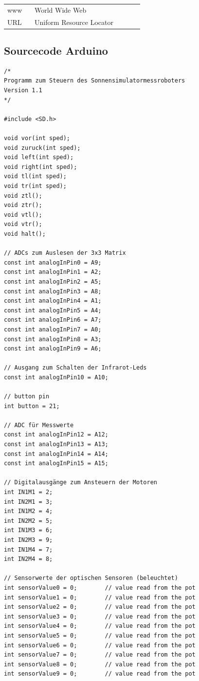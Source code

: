 \documentclass[a4paper,bibtotoc,oneside]{scrbook}
\begin{document}
\hspace{-17mm}\begin{tabular}{>{\raggedleft}p{0.2\linewidth} p{0.75\linewidth} p{0.1\linewidth}}
www & World Wide Web \\
URL & Uniform Resource Locator
\end{tabular}


\begin{appendix}
\chapter{Sourcecode Arduino}

\begin{verbatim}
/*
Programm zum Steuern des Sonnensimulatormessroboters
Version 1.1 
*/

#include <SD.h>

void vor(int sped);
void zuruck(int sped);
void left(int sped);
void right(int sped);
void tl(int sped);
void tr(int sped);
void ztl();
void ztr();
void vtl();
void vtr();
void halt(); 

// ADCs zum Auslesen der 3x3 Matrix
const int analogInPin0 = A9;  
const int analogInPin1 = A2;
const int analogInPin2 = A5;
const int analogInPin3 = A8;
const int analogInPin4 = A1;
const int analogInPin5 = A4;
const int analogInPin6 = A7;
const int analogInPin7 = A0;
const int analogInPin8 = A3;
const int analogInPin9 = A6;

// Ausgang zum Schalten der Infrarot-Leds
const int analogInPin10 = A10;

// button pin
int button = 21; 

// ADC für Messwerte
const int analogInPin12 = A12;
const int analogInPin13 = A13;
const int analogInPin14 = A14;
const int analogInPin15 = A15;

// Digitalausgänge zum Ansteuern der Motoren
int IN1M1 = 2;
int IN2M1 = 3;
int IN1M2 = 4;
int IN2M2 = 5;
int IN1M3 = 6;
int IN2M3 = 9;
int IN1M4 = 7;
int IN2M4 = 8;

// Sensorwerte der optischen Sensoren (beleuchtet)
int sensorValue0 = 0;        // value read from the pot
int sensorValue1 = 0;        // value read from the pot
int sensorValue2 = 0;        // value read from the pot
int sensorValue3 = 0;        // value read from the pot
int sensorValue4 = 0;        // value read from the pot
int sensorValue5 = 0;        // value read from the pot
int sensorValue6 = 0;        // value read from the pot
int sensorValue7 = 0;        // value read from the pot
int sensorValue8 = 0;        // value read from the pot
int sensorValue9 = 0;        // value read from the pot


\end{verbatim}
\end{appendix}
\end{document}
